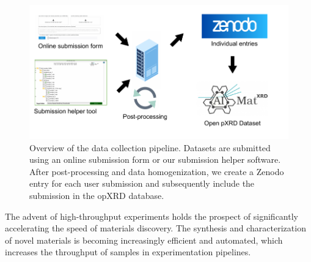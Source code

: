 


\begin{figure}[!ht]
    \centering
    \includegraphics{figures/overview.pdf}
    \caption{Overview of the data collection pipeline. Datasets are submitted using an online submission form or our submission helper software. After post-processing and data homogenization, we create a Zenodo entry for each user submission and subsequently include the submission in the opXRD database.}
    \label{fig:overview}
\end{figure}

The advent of high-throughput experiments holds the prospect of significantly accelerating the speed of materials discovery.
The synthesis and characterization of novel materials is becoming increasingly efficient and automated,
which increases the throughput of samples in experimentation pipelines.



